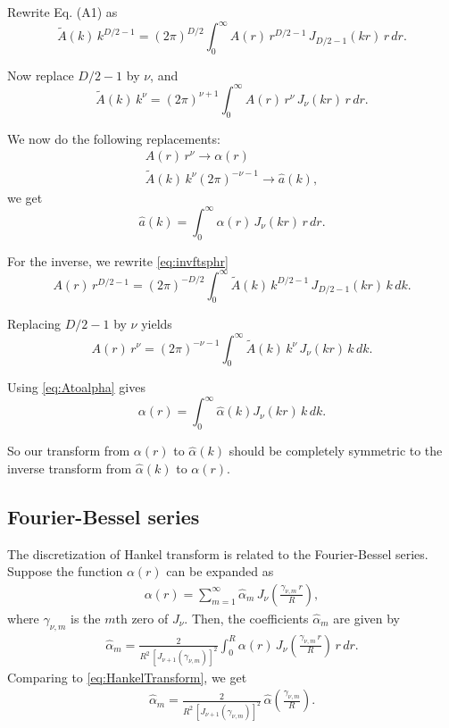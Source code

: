 \documentclass[preprint]{revtex4-1}
\numberwithin{equation}{subsection}
\numberwithin{table}{section}
\begin{document}
Rewrite Eq. (A1) as
\[
\tilde{A}(k) \, k^{D/2-1}
= (2 \pi)^{D/2}
\int_0^\infty A(r) \, r^{D/2-1} \, J_{D/2-1}(kr) \, r \, dr.
\]

Now replace $D/2 - 1$ by $\nu$, and
\[
\tilde{A}(k) \, k^\nu
= (2 \pi)^{\nu+1}
\int_0^\infty A(r) \, r^\nu \, J_{\nu}(kr) \, r \, dr.
\]

We now do the following replacements:
\begin{equation}
\begin{split}
  A(r) \, r^\nu \rightarrow \alpha(r) \\
  \tilde{A}(k) \, k^\nu (2\pi)^{-\nu-1}
  \rightarrow
  \hat a(k),
\end{split}
\label{eq:Atoalpha}
\end{equation}
we get
\begin{equation}
\hat a(k)
=
\int_0^\infty \alpha(r) \, J_\nu(kr) \, r \, dr.
\label{eq:HankelTransform}
\end{equation}

For the inverse, we rewrite \eqref{eq:invftsphr}
\[
A(r) \, r^{D/2-1}
=
(2\pi)^{-D/2}
\int_0^\infty \tilde{A}(k) \, k^{D/2-1} \, J_{D/2-1}(kr) \, k \, dk.
\]

Replacing $D/2 - 1$ by $\nu$ yields
\[
A(r) \, r^\nu
=
(2\pi)^{-\nu-1}
\int_0^\infty \tilde{A}(k) \, k^\nu \, J_\nu(kr) \, k \, dk.
\]

Using \eqref{eq:Atoalpha} gives
\begin{equation}
\alpha(r)
=
\int_0^\infty \hat \alpha(k) J_\nu(kr) \, k \, dk.
\label{eq:inverseHankelTransform}
\end{equation}

So our transform from $\alpha(r)$ to $\hat\alpha(k)$
should be completely symmetric to the inverse transform
from $\hat\alpha(k)$ to $\alpha(r)$.



\subsection{Fourier-Bessel series}

The discretization of Hankel transform
is related to the Fourier-Bessel series\cite{arfken}.
%
Suppose the function $\alpha(r)$ can be expanded as
%
\begin{align}
\alpha(r) = \sum_{m = 1}^\infty \hat\alpha_m \,
  J_\nu\left(
    \frac{ \gamma_{\nu, m} \, r } { R }
  \right),
  \label{eq:FourierBesselSeries}
\end{align}
%
where $\gamma_{\nu, m}$ is the $m$th zero of $J_\nu$.
%
Then, the coefficients $\hat\alpha_m$ are given by
%
\begin{align}
\hat\alpha_m
=
\frac{ 2 } { R^2 \, \left[ J_{\nu+1}(\gamma_{\nu, m}) \right]^2 }
\int_0^R \alpha(r) \, J_\nu\left(
    \frac{ \gamma_{\nu, m} \, r } { R }
  \right) \, r \, dr.
  \label{eq:FourierBesselSeries_cm}
\end{align}
%
Comparing to \eqref{eq:HankelTransform},
we get
\begin{align}
  \hat\alpha_m
=
  \frac{ 2 } { R^2 \, [J_{\nu + 1}(\gamma_{\nu, m})]^2 }
  \,
  \hat\alpha
  \left(
    \frac{ \gamma_{\nu, m} } { R }
  \right).
  \label{eq:twoalphahats}
\end{align}
\end{document}
